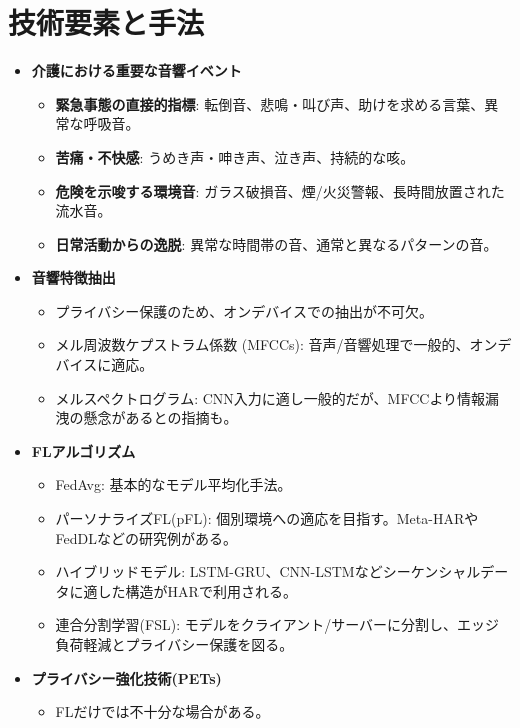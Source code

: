 \documentclass[unicode,12pt,aspectratio=169, dvipdfmx]{beamer}
\begin{document}
\section{技術要素と手法}
\begin{frame}{\insertsectionhead}
    \begin{itemize}
        \item \textbf{介護における重要な音響イベント}
        \begin{itemize}
            \item \textbf{緊急事態の直接的指標}: 転倒音、悲鳴・叫び声、助けを求める言葉、異常な呼吸音。
            \item \textbf{苦痛・不快感}: うめき声・呻き声、泣き声、持続的な咳。
            \item \textbf{危険を示唆する環境音}: ガラス破損音、煙/火災警報、長時間放置された流水音。
            \item \textbf{日常活動からの逸脱}: 異常な時間帯の音、通常と異なるパターンの音。
        \end{itemize}
        \item \textbf{音響特徴抽出}
        \begin{itemize}
            \item プライバシー保護のため、オンデバイスでの抽出が不可欠。
            \item メル周波数ケプストラム係数 (MFCCs): 音声/音響処理で一般的、オンデバイスに適応。
            \item メルスペクトログラム: CNN入力に適し一般的だが、MFCCより情報漏洩の懸念があるとの指摘も。
        \end{itemize}
        \item \textbf{FLアルゴリズム}
        \begin{itemize}
            \item FedAvg: 基本的なモデル平均化手法。
            \item パーソナライズFL(pFL): 個別環境への適応を目指す。Meta-HARやFedDLなどの研究例がある。
            \item ハイブリッドモデル: LSTM-GRU、CNN-LSTMなどシーケンシャルデータに適した構造がHARで利用される。
            \item 連合分割学習(FSL): モデルをクライアント/サーバーに分割し、エッジ負荷軽減とプライバシー保護を図る。
        \end{itemize}
        \item \textbf{プライバシー強化技術(PETs)}
        \begin{itemize}
            \item FLだけでは不十分な場合がある。

\end{itemize}
\end{itemize}
\end{frame}
\end{document}
